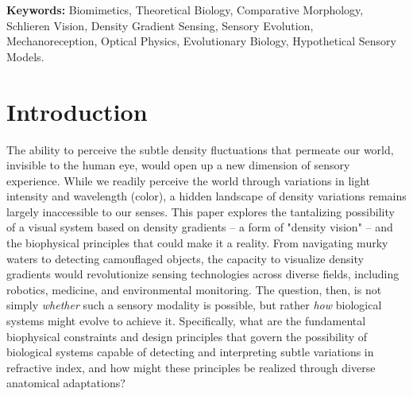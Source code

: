 \documentclass[11pt]{article}
\begin{document}
\noindent\textbf{Keywords:} Biomimetics, Theoretical Biology, Comparative Morphology, Schlieren Vision, Density Gradient Sensing, Sensory Evolution, Mechanoreception, Optical Physics, Evolutionary Biology, Hypothetical Sensory Models.


\newpage

\section{Introduction}

The ability to perceive the subtle density fluctuations that permeate our world, invisible to the human eye, would open up a new dimension of sensory experience. While we readily perceive the world through variations in light intensity and wavelength (color), a hidden landscape of density variations remains largely inaccessible to our senses. This paper explores the tantalizing possibility of a visual system based on density gradients – a form of "density vision" – and the biophysical principles that could make it a reality. From navigating murky waters to detecting camouflaged objects, the capacity to visualize density gradients would revolutionize sensing technologies across diverse fields, including robotics, medicine, and environmental monitoring. The question, then, is not simply \textit{whether} such a sensory modality is possible, but rather \textit{how} biological systems might evolve to achieve it. Specifically, what are the fundamental biophysical constraints and design principles that govern the possibility of biological systems capable of detecting and interpreting subtle variations in refractive index, and how might these principles be realized through diverse anatomical adaptations?
\end{document}
